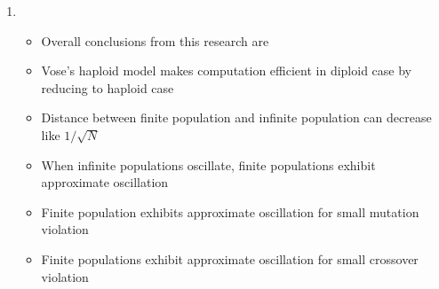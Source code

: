 \documentclass{article}
\begin{document}
\begin{enumerate}
\item
  \begin{itemize}
  \item Overall conclusions from this research are
  \item Vose's haploid model makes computation efficient in diploid case by reducing to haploid case 
  \item Distance between finite population and infinite population can decrease like $1/\sqrt{N}$
  \item When infinite populations oscillate, finite populations exhibit approximate oscillation
  \item Finite population exhibits approximate oscillation for small mutation violation
  \item Finite populations exhibit approximate oscillation for small crossover violation      
  
  \end{itemize}
  
% 
%   


\end{enumerate}
\end{document}
